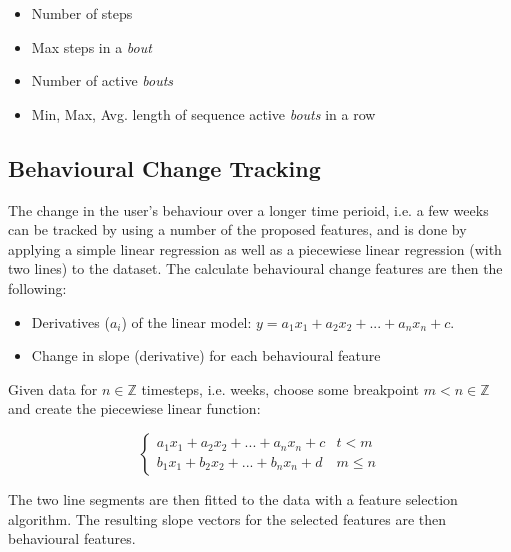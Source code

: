 \begin{itemize}
    \item Number of steps
    \item Max steps in a \textit{bout}
    \item Number of active \textit{bouts}
    \item Min, Max, Avg. length of sequence active \textit{bouts} in a row
\end{itemize}
    
\subsection{Behavioural Change Tracking}
The change in the user's behaviour over a longer time perioid, i.e. a few weeks can be tracked by using a number of the proposed features, and is done by applying a simple linear regression as well as a piecewiese linear regression (with two lines) to the dataset. The calculate behavioural change features are then the following:

\begin{itemize}
    \item Derivatives ($a_i$) of the linear model: $y=a_1 x_1 + a_2 x_2 + ... + a_n x_n + c$.
    \item Change in slope (derivative) for each behavioural feature
\end{itemize}

Given data for $n \in \mathbb{Z}$ timesteps, i.e. weeks, choose some breakpoint $m < n \in \mathbb{Z}$ and create the piecewiese linear function:

\[ \begin{cases} 
      a_1 x_1 + a_2 x_2 + ... + a_n x_n + c & t <    m \\
      b_1 x_1 + b_2 x_2 + ... + b_n x_n + d & m \leq n 
   \end{cases}
\]

The two line segments are then fitted to the data with a feature selection algorithm. The resulting slope vectors for the selected features are then behavioural features.


